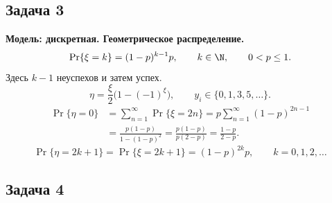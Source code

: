 \subsection{Задача 3}

\begin{solution}
    \textbf{Модель: дискретная. Геометрическое распределение.}
    \[
        \Pr\{\xi=k\}=(1-p)^{k-1}p,\qquad k\in\N,\qquad 0<p\leq1.
    \]
    Здесь $k-1$ неуспехов и затем успех.
    \[
        \eta=\frac{\xi}{2}\bigl(1-(-1)^\xi\bigr),\qquad
        y_i\in\{0,1,3,5,\ldots\}.
    \]
    \[
        \begin{aligned}
            \Pr\{\eta=0\}
            &=\sum_{n=1}^{\infty}\Pr\{\xi=2n\}
             =p\sum_{n=1}^{\infty}(1-p)^{2n-1}\\
            &=\frac{p(1-p)}{1-(1-p)^2}
             =\frac{p(1-p)}{p(2-p)}
             =\boxed{\frac{1-p}{2-p}}.
        \end{aligned}
    \]
    \[
        \Pr\{\eta=2k+1\}=\Pr\{\xi=2k+1\}
        =\boxed{(1-p)^{2k}p},\qquad k=0,1,2,\ldots
    \]
\end{solution}

\clearpage
\subsection{Задача 4}

